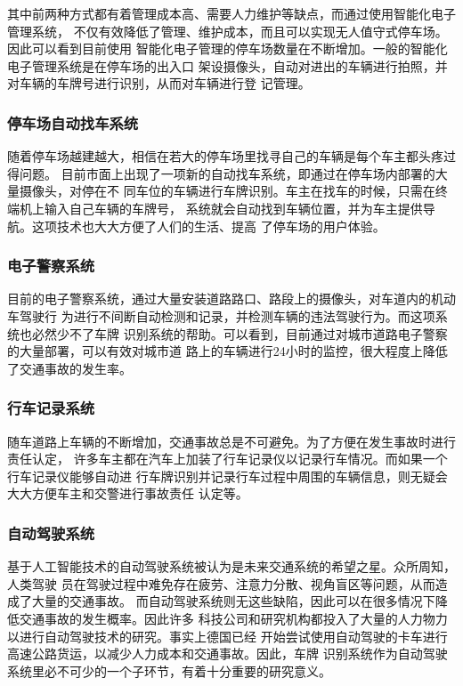 其中前两种方式都有着管理成本高、需要人力维护等缺点，而通过使用智能化电子管理系统，
不仅有效降低了管理、维护成本，而且可以实现无人值守式停车场。因此可以看到目前使用
智能化电子管理的停车场数量在不断增加。一般的智能化电子管理系统是在停车场的出入口
架设摄像头，自动对进出的车辆进行拍照，并对车辆的车牌号进行识别，从而对车辆进行登
记管理。

\subsubsection{停车场自动找车系统}

随着停车场越建越大，相信在若大的停车场里找寻自己的车辆是每个车主都头疼过得问题。
目前市面上出现了一项新的自动找车系统，即通过在停车场内部署的大量摄像头，对停在不
同车位的车辆进行车牌识别。车主在找车的时候，只需在终端机上输入自己车辆的车牌号，
系统就会自动找到车辆位置，并为车主提供导航。这项技术也大大方便了人们的生活、提高
了停车场的用户体验。

\subsubsection{电子警察系统}

目前的电子警察系统，通过大量安装道路路口、路段上的摄像头，对车道内的机动车驾驶行
为进行不间断自动检测和记录，并检测车辆的违法驾驶行为。而这项系统也必然少不了车牌
识别系统的帮助。可以看到，目前通过对城市道路电子警察的大量部署，可以有效对城市道
路上的车辆进行24小时的监控，很大程度上降低了交通事故的发生率。

\subsubsection{行车记录系统}

随车道路上车辆的不断增加，交通事故总是不可避免。为了方便在发生事故时进行责任认定，
许多车主都在汽车上加装了行车记录仪以记录行车情况。而如果一个行车记录仪能够自动进
行车牌识别并记录行车过程中周围的车辆信息，则无疑会大大方便车主和交警进行事故责任
认定等。

\subsubsection{自动驾驶系统}

基于人工智能技术的自动驾驶系统被认为是未来交通系统的希望之星。众所周知，人类驾驶
员在驾驶过程中难免存在疲劳、注意力分散、视角盲区等问题，从而造成了大量的交通事故。
而自动驾驶系统则无这些缺陷，因此可以在很多情况下降低交通事故的发生概率。因此许多
科技公司和研究机构都投入了大量的人力物力以进行自动驾驶技术的研究。事实上德国已经
开始尝试使用自动驾驶的卡车进行高速公路货运，以减少人力成本和交通事故。因此，车牌
识别系统作为自动驾驶系统里必不可少的一个子环节，有着十分重要的研究意义。

